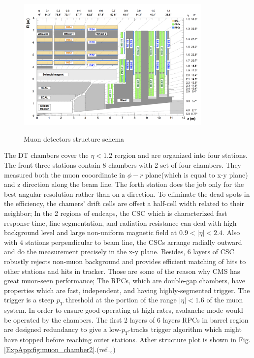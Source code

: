 			\begin{figure}[H]
			\centering{}
		    	\includegraphics[width=0.85\textwidth]{Figures/ExpApparatus/muon_chamber.png}\\
			\caption{Muon detectors structure schema\cite{Sirunyan:2018fp}}
			\label{ExpApp:fig:muon_chamber1}
			\end{figure}
			\FloatBarrier

			The DT chambers cover the $\eta < 1.2$ rergion and are organized into four stations. The front three stations contain 8 chambers with 2 set of four chambers. They measured both the muon cooordinate in $\phi - r$ plane(which is equal to x-y plane) and z direction along the beam line. The forth station does the job only for the best angular resolution rather than on z-direction. To eliminate the dead spots in the efficiency, the chamers' drift cells are offset a half-cell width related to their neighbor; In the 2 regions of endcaps, the CSC which is characterized fast response time, fine segmentation, and radiation resistance can deal with high background level and large non-uniform magnetic field at $0.9 < |\eta| < 2.4$. Also with 4 stations perpendicular to beam line, the CSCs arrange radially outward and do the measurement precisely in the x-y plane. Besides, 6 layers of CSC robustly rejects non-muon background and provides efficient matching of hits to other stations and hits in tracker. Those are some of the reason why CMS has great muon-seen performance; The RPCs, which are double-gap chambers, have properties which are fast, independent, and having highly-segmented trigger. The trigger is a steep $p_T$ threshold at the portion of the range $|\eta| < 1.6$ of the muon system. In order to ensure good operating at high rates, avalanche mode would be operated by the chambers. The first 2 layers of 6 layers RPCs in barrel region are designed redundancy to give a low-$p_T$-tracks trigger algorithm which might have stopped before reaching outer stations. Ather structure plot is shown in Fig.\ref{ExpApp:fig:muon_chamber2}.(ref.\cite{Chatrchyan:2008aa},\cite{Chatrchyan:2013sba},\cite{Sirunyan:2018fpa})
		
